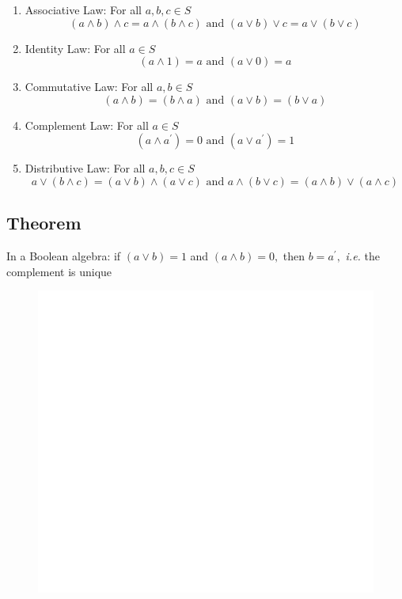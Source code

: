 \documentclass[]{book}
\begin{document}
\begin{enumerate}
\def\labelenumi{(\alph{enumi})}
\item
  Associative Law: For all \(a,b,c \in S\)
  \[(a \land b) \land c = a \land (b\land c) \text{ and } (a \lor b) \lor c = a \lor (b\lor c)\]
\item
  Identity Law: For all \(a \in S\)
  \[(a \land 1)  = a  \text{ and } (a \lor 0)  = a\]
\item
  Commutative Law: For all \(a,b\in S\)
  \[(a \land b)  = (b \land a)  \text{ and } (a \lor b)  = (b \lor a)\]
\item
  Complement Law: For all \(a\in S\)
  \[(a \land a^\prime)  = 0 \text{ and } (a \lor a^\prime)  = 1\]
\item
  Distributive Law: For all \(a,b,c\in S\)
  \[a \lor (b\land c) = (a \lor b) \land (a \lor c)  \text{ and }  a \land (b\lor c)= (a \land b) \lor (a \land c)\]
\end{enumerate}

\hypertarget{theorem-1}{%
\subsection{Theorem}\label{theorem-1}}

In a Boolean algebra: if \((a\lor b) =1\) and \((a\land b) =0,\) then \(b=a^\prime,\) \emph{i.e.} the complement is unique

\begin{figure}

{\centering \includegraphics[width=1\linewidth]{figure/boxC412-1} 

}

\end{figure}
\end{document}
